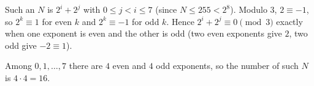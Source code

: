 Such an $N$ is $2^i+2^j$ with $0\le j<i\le7$ (since $N\le255<2^8$). Modulo $3$, $2\equiv-1$, so $2^k\equiv1$ for even $k$ and $2^k\equiv-1$ for odd $k$. Hence $2^i+2^j\equiv0\pmod3$ exactly when one exponent is even and the other is odd (two even exponents give $2$, two odd give $-2\equiv1$).

Among $0,1,\dots,7$ there are $4$ even and $4$ odd exponents, so the number of such $N$ is $4\cdot4=\boxed{16}$.
